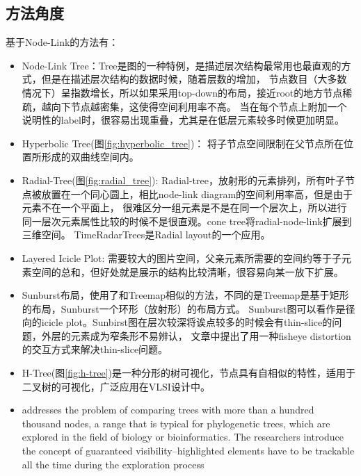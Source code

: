 \documentclass{article}
\begin{document}
\subsection{方法角度}
基于Node-Link的方法有：
\begin{itemize}
	\item Node-Link Tree：Tree是图的一种特例，是描述层次结构最常用也最直观的方式，但是在描述层次结构的数据时候，随着层数的增加，
		节点数目（大多数情况下）呈指数增长，所以如果采用top-down的布局，接近root的地方节点稀疏，越向下节点越密集，这使得空间利用率不高。
		当在每个节点上附加一个说明性的label时，很容易出现重叠，尤其是在低层元素较多时候更加明显。

	\item Hyperbolic Tree(图\ref{fig:hyperbolic_tree})： 将子节点空间限制在父节点所在位置所形成的双曲线空间内。

	\item Radial-Tree(图\ref{fig:radial_tree}):
		Radial-tree，放射形的元素排列，所有叶子节点被放置在一个同心圆上，相比node-link diagram的空间利用率高，但是由于元素不在一个平面上，
		很难区分一组元素是不是在同一个层次上，所以进行同一层次元素属性比较的时候不是很直观。cone tree将radial-node-link扩展到三维空间。
		TimeRadarTrees\cite{Burch2011TimeRadar}是Radial layout的一个应用。

	\item Layered Icicle Plot:
		需要较大的图片空间，父亲元素所需要的空间约等于子元素空间的总和，但好处就是展示的结构比较清晰，很容易向某一放下扩展。

	\item Sunburst布局，使用了和Treemap相似的方法，不同的是Treemap是基于矩形的布局，Sunburst一个环形（放射形）的布局方式。
		Sunburst图可以看作是径向的icicle plot。Sunbirst图在层次较深将诶点较多的时候会有thin-slice的问题，外层的元素成为窄条形不易辨认，
		文章中提出了用一种fisheye distortion的交互方式来解决thin-slice问题。

	\item H-Tree(图\ref{fig:h-tree})是一种分形的树可视化，节点具有自相似的特性，适用于二叉树的可视化，广泛应用在VLSI设计中\cite{browning1980tree}。

	\item \cite{munzner2003treejuxtaposer}addresses the problem of comparing
		trees with more than a hundred thousand nodes, a range that is typical for phylogenetic trees,
		which are explored in the field of biology or bioinformatics.
		The researchers introduce the concept of guaranteed visibility--highlighted elements have
		to be trackable all the time during the exploration process

\end{itemize}
\end{document}
